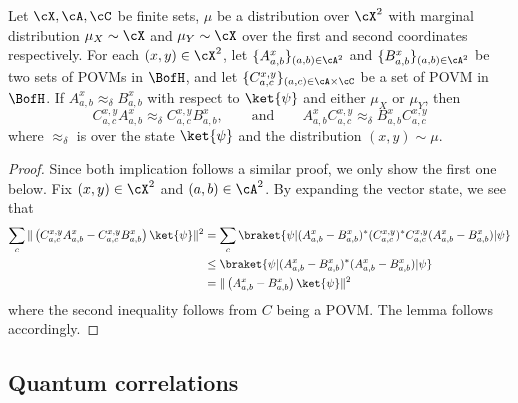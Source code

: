 \begin{lemma} \label{lem:combmeasure}
	Let $\cX, \cA, \cC$ be finite sets, $\mu$ be a distribution over $\cX^2$ with marginal distribution $\mu_X \sim \cX$ and $\mu_Y \sim \cX$ over the first and second coordinates respectively. For each $(x,y) \in \cX^2$, let $\{ A_{a,b}^x \}_{(a,b) \in \cA^2}$ and  $\{ B_{a,b}^x \}_{(a,b) \in \cA^2}$ be two sets of POVMs in $\BofH$, and let $\{ C_{a,c}^{x,y} \}_{(a,c) \in \cA  \times \cC}$ be a set of POVM in $\BofH$. If $A^{x}_{a,b} \approx_{\delta} B^{x}_{a,b}$ with respect to $\ket{\psi}$ and either $\mu_X$ or $\mu_Y$, then 
	\begin{equation*}
		C_{a,c}^{x,y} A^{x}_{a,b}  \approx_{\delta}C_{a,c}^{x,y} B^{x}_{a,b}, \qquad \text{and} \qquad  A^{x}_{a,b}  C_{a,c}^{x,y} \approx_{\delta} B^{x}_{a,b}C_{a,c}^{x,y}
	\end{equation*}
	where $\approx_{\delta}$ is over the state $\ket{\psi}$ and the distribution $(x,y) \sim \mu$. 
\end{lemma}
\begin{proof}
 	Since both implication follows a similar proof, we only show the first one below. Fix $(x,y) \in \cX^2$ and $(a,b) \in \cA^2$. By expanding the vector state, we see that
	\begin{align*}
		\sum_c  \| \left(C_{a,c}^{x,y} A^{x}_{a,b}  -  C_{a,c}^{x,y} B^{x}_{a,b}   \right) \ket{\psi}\|^2 &= \sum_c \braket{\psi| (A^{x}_{a,b} -  B^{x}_{a,b})^*  (C_{a,c}^{x,y})^*C_{a,c}^{x,y}  (A^{x}_{a,b} -  B^{x}_{a,b})|\psi } \\
		&\leq  \braket{\psi| (A^{x}_{a,b} -  B^{x}_{a,b})^* (A^{x}_{a,b} -  B^{x}_{a,b})|\psi } \\
		&=	 \| \left(	A^{x}_{a,b}  - B^{x}_{a,b}   \right) \ket{\psi}\|^2  
	\end{align*}
	where the second inequality follows from $C$ being a POVM. The lemma follows accordingly.
\end{proof}

\subsection{Quantum correlations } \label{sec:introcorrelations}

